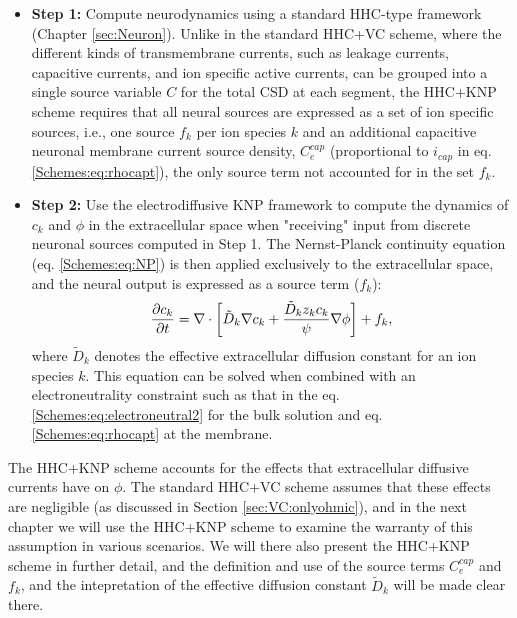 \begin{itemize}
\item {\bf Step 1:} Compute neurodynamics using a standard HHC-type framework (Chapter \ref{sec:Neuron}). Unlike in the standard HHC+VC scheme, where the different kinds of transmembrane currents, such as leakage currents, capacitive currents, and ion specific active currents, can be grouped into a single source variable $C$ for the total CSD at each segment, the HHC+KNP scheme requires that all neural sources are expressed as a set of ion specific sources, i.e., one source $f_k$ per ion species $k$ and an additional capacitive neuronal membrane current source density, $C_e^{cap}$ (proportional to $i_{cap}$ in eq. \ref{Schemes:eq:rhocapt}), the only source term not accounted for in the set $f_k$.

\item {\bf Step 2:} Use the electrodiffusive KNP framework to compute the dynamics of $c_k$ and $\phi$ in the extracellular space when "receiving" input from discrete neuronal sources computed in Step 1. The Nernst-Planck continuity equation (eq. \ref{Schemes:eq:NP}) is then applied exclusively to the extracellular space, and the neural output is expressed as a source term ($f_k$):
\begin{equation}
\frac{\partial c_k}{\partial t} = {\bf \nabla} \cdot \left[ \tilde{D}_k {\bf \nabla} c_k + \frac{\tilde{D}_k z_k c_k}{\psi} {\bf \nabla} \phi \right] + f_k,
\label{Schemes:eq:NPe}
\end{equation}
where $\tilde{D}_k$ denotes the effective extracellular diffusion constant for an ion species $k$. This equation can be solved when combined with an electroneutrality constraint such as that in the
eq. \ref{Schemes:eq:electroneutral2} for the bulk solution and eq. \ref{Schemes:eq:rhocapt} at the membrane.
\end{itemize}

The HHC+KNP scheme accounts for the effects that extracellular diffusive currents have on $\phi$.
The standard HHC+VC scheme assumes that these effects are negligible (as discussed in Section \ref{sec:VC:onlyohmic}), and in the next chapter we will use the HHC+KNP scheme to examine the warranty of this assumption in various scenarios. We will there also present the HHC+KNP scheme in further detail, and the definition and use of the source terms  $C_e^{cap}$ and  $f_k$, and the intepretation of the effective diffusion constant $\tilde{D}_k$ will be made clear there.




